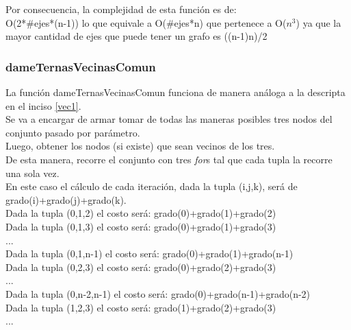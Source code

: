 Por consecuencia, la complejidad de esta funci\'on es de:\\

O(2*\#ejes*(n-1)) lo que equivale a O(\#ejes*n) que pertenece a O($n^3$) ya que la mayor cantidad de ejes que puede tener un grafo es ((n-1)n)/2


\subsubsection{dameTernasVecinasComun}\label{vec2}

La funci\'on dameTernasVecinasComun funciona de manera an\'aloga a la descripta en el inciso \ref{vec1}.\\

Se va a encargar de armar tomar de todas las maneras posibles tres nodos del conjunto pasado por par\'ametro.\\

Luego, obtener los nodos (si existe) que sean vecinos de los tres.\\

De esta manera, recorre el conjunto con tres \emph{for}s tal que cada tupla la recorre una sola vez.\\

En este caso el c\'alculo de cada iteraci\'on, dada la tupla (i,j,k), ser\'a de grado(i)+grado(j)+grado(k).\\

Dada la tupla (0,1,2) el costo ser\'a: grado(0)+grado(1)+grado(2)\\

Dada la tupla (0,1,3) el costo ser\'a: grado(0)+grado(1)+grado(3)\\

...\\

Dada la tupla (0,1,n-1) el costo ser\'a: grado(0)+grado(1)+grado(n-1)\\

Dada la tupla (0,2,3) el costo ser\'a: grado(0)+grado(2)+grado(3)\\

...\\

Dada la tupla (0,n-2,n-1) el costo ser\'a: grado(0)+grado(n-1)+grado(n-2)\\

Dada la tupla (1,2,3) el costo ser\'a: grado(1)+grado(2)+grado(3)\\

...\\

